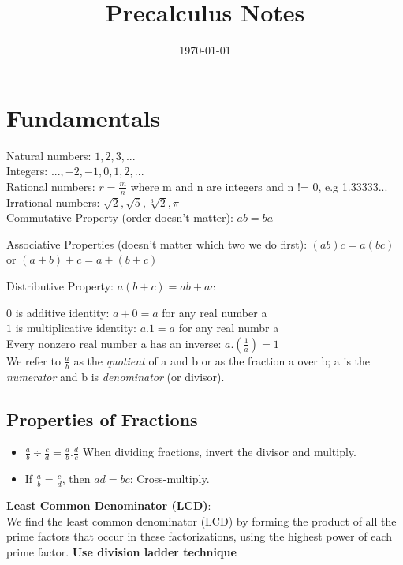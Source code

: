 \documentclass{article}
\title{Precalculus Notes}
\date{\today}
\begin{document}
\maketitle

\section*{Fundamentals}

Natural numbers: $ 1, 2, 3, ... $ \\
Integers: $..., -2, -1, 0, 1, 2, ...$ \\
Rational numbers: $ r = \frac{m}{n} $ where m and n are integers and n != 0, e.g 1.33333... \\
Irrational numbers: $ \sqrt{2}, \sqrt{5}, \sqrt[3]{2}, \pi  $ \\
\newline
Commutative Property (order doesn't matter): $ ab = ba $

Associative Properties (doesn't matter which two we do first):
$ (ab)c = a(bc) $ or $ (a+b) + c = a + (b+c) $

Distributive Property: $ a(b + c) = ab + ac $


$0$ is additive identity: $ a + 0 = a $ for any real number a\\
$1$ is multiplicative identity: $ a . 1 = a $ for any real numbr a\\
Every nonzero real number a has an inverse: $ a . (\frac{1}{a}) = 1 $\\

We refer to $\frac{a}{b}$ as the \emph{quotient} of a and b or as the fraction a over b; a is the \emph{numerator} and b is \emph{denominator} (or divisor).

\subsection*{Properties of Fractions}
\begin{itemize}
\item $ \frac{a}{b} \div \frac{c}{d} = \frac{a}{b} . \frac{d}{c} $ When dividing fractions, invert the divisor and multiply.
\item If $ \frac{a}{b} = \frac{c}{d} $, then $ ad = bc $: Cross-multiply.
\end{itemize}

\textbf{Least Common Denominator (LCD)}: \\
We find the least common denominator (LCD) by forming the product of
all the prime factors that occur in these factorizations, using the
highest power of each prime factor. \textbf{Use division ladder technique}
\end{document}
